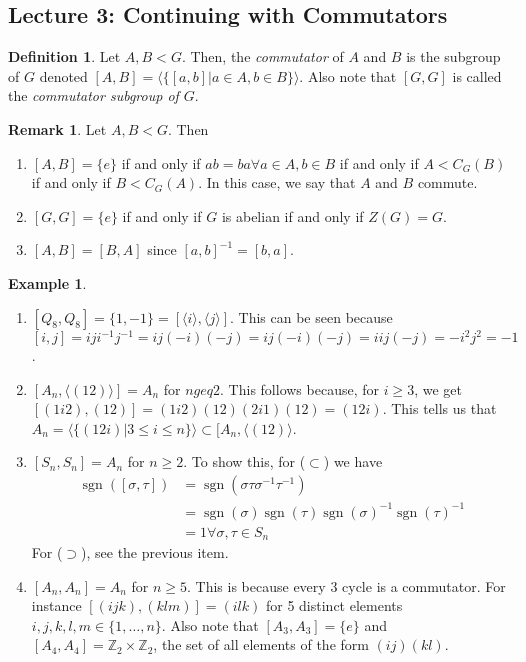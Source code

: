 \documentclass[11pt,leqno,oneside]{amsart}
\newcommand{\Z}{{\mathbb Z}} %
\newcommand{\sgn}{\operatorname{sgn}} %
\newcommand{\subgroup}{\mathrel{<}}
\theoremstyle{definition}
\newtheorem{defn}[thm]{Definition}
\newtheorem{example}[thm]{Example}
\newtheorem{rmk}[thm]{Remark}
\numberwithin{equation}{section}
\begin{document}
\subsection*{Lecture 3: Continuing with Commutators}
\begin{defn}
    Let $A, B \subgroup G$. Then, the \emph{commutator} of $A$ and $B$ is the
    subgroup of $G$ denoted $[A,B] = \langle \{[a,b] | a \in A, b \in B\}
    \rangle$. Also note that $[G,G]$ is called the \emph{commutator subgroup of
    $G$}.
\end{defn}
\begin{rmk}
    Let $A,B \subgroup G$. Then
    \begin{enumerate}
        \item $[A,B] = \{e\}$ if and only if $ab = ba \forall a \in A, b \in B$
            if and only if $A \subgroup C_G(B)$ if and only if $B \subgroup
            C_G(A)$. In this case, we say that $A$ and $B$ commute.
        \item $[G,G] = \{e\}$ if and only if $G$ is abelian if and only if $Z(G) = G$.
        \item $[A,B] = [B,A]$ since $[a,b]^{-1} = [b,a]$.
    \end{enumerate}
\end{rmk}
\begin{example}
    \begin{enumerate}
        \item $[Q_8,Q_8] = \{1,-1\} = [\langle i \rangle, \langle j \rangle]$.
            This can be seen because $[i,j] = iji^{-1}j^{-1} = ij(-i)(-j) =
            ij(-i)(-j) = iij(-j) = -i^2j^2 = -1$.
        \item $[A_n, \langle (12) \rangle] = A_n$ for $n geq 2$. This follows
            because, for $i \geq 3$, we get $[(1i2),(12)] = (1i2)(12)(2i1)(12)
            = (12i)$. This tells us that $A_n = \langle \{(12i) | 3 \leq i \leq
            n\} \rangle \subset [A_n, \langle (12)\rangle$.
        \item $[S_n,S_n] = A_n$ for $n \geq 2$. To show this, for ($\subset$)
            we have \begin{align*}
                \sgn( [\sigma,\tau] ) & = \sgn(\sigma \tau \sigma^{-1} \tau^{-1}) \\
                \ & = \sgn(\sigma) \sgn(\tau) \sgn(\sigma)^{-1} \sgn(\tau)^{-1} \\
                \ & = 1 \forall \sigma, \tau \in S_n
            \end{align*}
            For ($\supset$), see the previous item.
        \item $[A_n,A_n] = A_n$ for $n \geq 5$. This is because every 3 cycle
            is a commutator. For instance $[(ijk),(klm)] = (ilk)$ for 5
            distinct elements $i,j,k,l,m \in \{1, \ldots, n\}$. Also note that
            $[A_3,A_3] = \{e\}$ and $[A_4,A_4] = \Z_2 \times \Z_2$, the set of
            all elements of the form $(ij)(kl)$.
    \end{enumerate}
\end{example}
\end{document}
